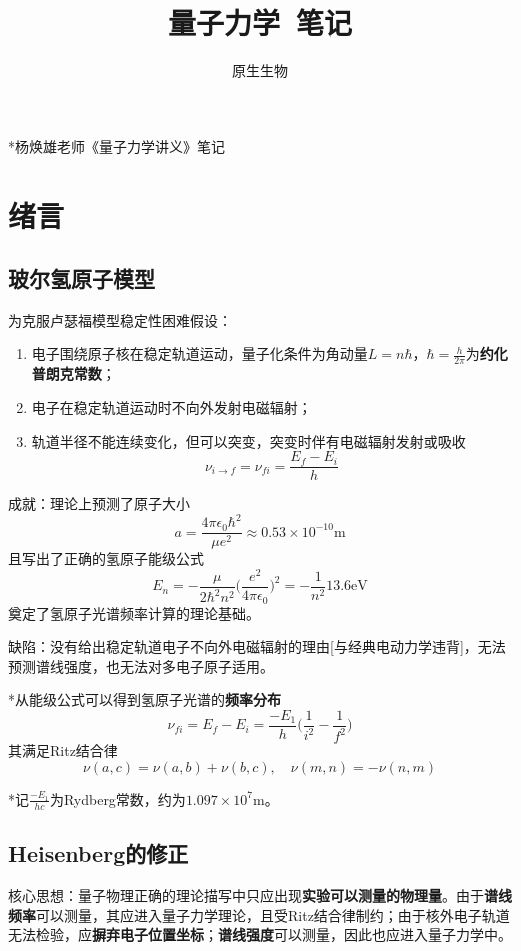 \documentclass[a4paper,UTF8,fontset=windows]{ctexart}
\title{\textbf{量子力学\ 笔记}}
\author{原生生物}
\date{}
\begin{document}
\maketitle

*杨焕雄老师《量子力学讲义》笔记

\tableofcontents

\newpage
\section{绪言}
\subsection{玻尔氢原子模型}
为克服卢瑟福模型稳定性困难假设：
\begin{enumerate}
    \item 电子围绕原子核在稳定轨道运动，量子化条件为角动量$L=n\hbar$，$\hbar=\frac{h}{2\pi}$为\textbf{约化普朗克常数}；
    \item 电子在稳定轨道运动时不向外发射电磁辐射；
    \item 轨道半径不能连续变化，但可以突变，突变时伴有电磁辐射发射或吸收
    $$\nu_{i\to f}=\nu_{fi}=\frac{E_f-E_i}{h}$$
\end{enumerate}

成就：理论上预测了原子大小
$$a=\frac{4\pi\epsilon_0\hbar^2}{\mu e^2}\approx0.53\times10^{-10}\text{m}$$
且写出了正确的氢原子能级公式
$$E_n=-\frac{\mu}{2\hbar^2n^2}\bigg(\frac{e^2}{4\pi\epsilon_0}\bigg)^2=-\frac{1}{n^2}13.6\text{eV}$$
奠定了氢原子光谱频率计算的理论基础。

缺陷：没有给出稳定轨道电子不向外电磁辐射的理由[与经典电动力学违背]，无法预测谱线强度，也无法对多电子原子适用。

*从能级公式可以得到氢原子光谱的\textbf{频率分布}
$$\nu_{fi}=E_f-E_i=\frac{-E_1}{h}\bigg(\frac{1}{i^2}-\frac{1}{f^2}\bigg)$$
其满足Ritz结合律
$$\nu(a,c)=\nu(a,b)+\nu(b,c),\quad\nu(m,n)=-\nu(n,m)$$

*记$\frac{-E_1}{hc}$为Rydberg常数，约为$1.097\times10^7\text{m}$。

\subsection{Heisenberg的修正}
核心思想：量子物理正确的理论描写中只应出现\textbf{实验可以测量的物理量}。由于\textbf{谱线频率}可以测量，其应进入量子力学理论，且受Ritz结合律制约；由于核外电子轨道无法检验，应\textbf{摒弃电子位置坐标}；\textbf{谱线强度}可以测量，因此也应进入量子力学中。
\end{document}
